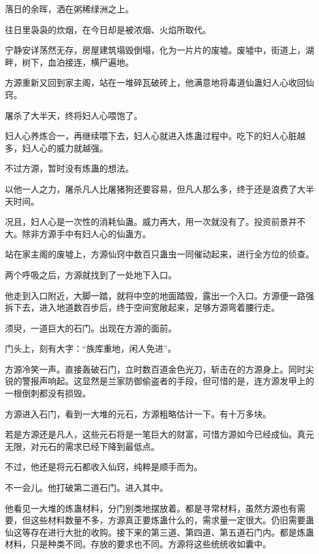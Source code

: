 
\begin{this_body}

落日的余晖，洒在粥稀绿洲之上。

往日里袅袅的炊烟，在今日却是被浓烟、火焰所取代。

宁静安详荡然无存，房屋建筑塌毁倒塌，化为一片片的废墟。废墟中，街道上，湖畔，树下，血泊接连，横尸遍地。

方源重新又回到家主阁，站在一堆碎瓦破砖上，他满意地将毒道仙蛊妇人心收回仙窍。

屠杀了大半天，终将妇人心喂饱了。

妇人心养炼合一，再继续喂下去，妇人心就进入炼蛊过程中。吃下的妇人心脏越多，妇人心的威力就越强。

不过方源，暂时没有炼蛊的想法。

以他一人之力，屠杀凡人比屠猪狗还要容易，但凡人那么多，终于还是浪费了大半天时间。

况且，妇人心是一次性的消耗仙蛊。威力再大，用一次就没有了。投资前景并不大。除非方源手中有妇人心的仙蛊方。

站在家主阁的废墟上，方源仙窍中数百只蛊虫一同催动起来，进行全方位的侦查。

两个呼吸之后，方源就找到了一处地下入口。

他走到入口附近，大脚一踏，就将中空的地面踏毁，露出一个入口。方源便一路强拆下去，进入地道数百步后，终于空间宽敞起来，足够方源弯着腰行走。

须臾，一道巨大的石门。出现在方源的面前。

门头上，刻有大字：“族库重地，闲人免进”。

方源冷笑一声。直接轰破石门，立时数百道金色光刀，斩击在的方源身上。同时尖锐的警报声响起。这显然是兰家防御偷盗者的手段，但可惜的是，连方源发甲上的一根倒刺都没有损毁。

方源进入石门，看到一大堆的元石，方源粗略估计一下。有十万多块。

若是方源还是凡人，这些元石将是一笔巨大的财富，可惜方源如今已经成仙。真元无限，对元石的需求已经下降到最低点。

不过，他还是将元石都收入仙窍，纯粹是顺手而为。

不一会儿。他打破第二道石门。进入其中。

他看见一大堆的炼蛊材料，分门别类地摆放着。都是寻常材料，虽然方源也有需要，但这些材料数量不多，方源真正要炼蛊什么的，需求量一定很大。仍旧需要蛊仙这等存在进行大批的收购。接下来的第三道、第四道、第五道石门内。都是炼蛊材料，只是种类不同。存放的要求也不同。方源将这些统统收如囊中。


\end{this_body}
